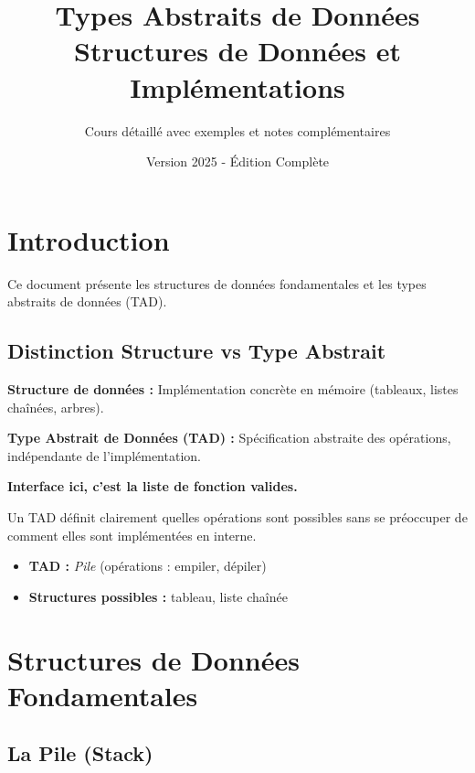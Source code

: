\documentclass[12pt,a4paper]{article}
\title{\textbf{\Huge\color{titrebleu}Types Abstraits de Données}\\[0.5em]
\large\color{defvert}Structures de Données et Implémentations}
\author{\large Cours détaillé avec exemples et notes complémentaires}
\date{\large Version 2025 - Édition Complète}
\begin{document}
\maketitle
\tableofcontents
\newpage

\section{Introduction}

Ce document présente les structures de données fondamentales et les types abstraits de données (TAD).

\subsection{Distinction Structure vs Type Abstrait}

\begin{definition}
\textbf{Structure de données :} Implémentation concrète en mémoire (tableaux, listes chaînées, arbres).

\textbf{Type Abstrait de Données (TAD) :} Spécification abstraite des opérations, indépendante de l'implémentation.
\end{definition}

\begin{notecours}
\textbf{Interface ici, c'est la liste de fonction valides.}

Un TAD définit clairement quelles opérations sont possibles sans se préoccuper de comment elles sont implémentées en interne.
\end{notecours}

\begin{exemple}
\begin{itemize}
    \item \textbf{TAD :} \textit{Pile} (opérations : empiler, dépiler)
    \item \textbf{Structures possibles :} tableau, liste chaînée
\end{itemize}
\end{exemple}

\newpage
\section{Structures de Données Fondamentales}

\subsection{La Pile (Stack)}
\end{document}
